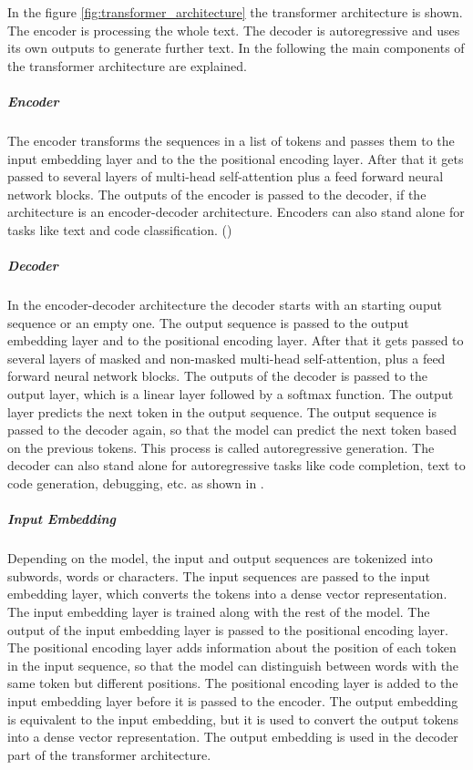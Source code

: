 In the figure \ref{fig:transformer_architecture} the transformer architecture is shown. The encoder is processing the whole text. The decoder is autoregressive and uses its own outputs to generate further text. In the following the main components of the transformer architecture are explained.

\subparagraph{Encoder}

The encoder transforms the sequences in a list of tokens and passes them to the input embedding layer and to the the positional encoding layer. After that it gets passed to several layers of multi-head self-attention plus a feed forward neural network blocks. The outputs of the encoder is passed to the decoder, if the architecture is an encoder-decoder architecture. Encoders can also stand alone for tasks like text and code classification. (\cite{Hou.8212023})

\subparagraph{Decoder}

In the encoder-decoder architecture the decoder starts with an starting ouput sequence or an empty one. The output sequence is passed to the output embedding layer and to the positional encoding layer. After that it gets passed to several layers of masked and non-masked multi-head self-attention, plus a feed forward neural network blocks. The outputs of the decoder is passed to the output layer, which is a linear layer followed by a softmax function. The output layer predicts the next token in the output sequence. The output sequence is passed to the decoder again, so that the model can predict the next token based on the previous tokens. This process is called autoregressive generation.
The decoder can also stand alone for autoregressive tasks like code completion, text to code generation, debugging, etc. as shown in \cite{Hou.8212023}.

\subparagraph{Input Embedding}
Depending on the model, the input and output sequences are tokenized into subwords, words or characters. The input sequences are passed to the input embedding layer, which converts the tokens into a dense vector representation. The input embedding layer is trained along with the rest of the model. The output of the input embedding layer is passed to the positional encoding layer. The positional encoding layer adds information about the position of each token in the input sequence, so that the model can distinguish between words with the same token but different positions. The positional encoding layer is added to the input embedding layer before it is passed to the encoder. The output embedding is equivalent to the input embedding, but it is used to convert the output tokens into a dense vector representation. The output embedding is used in the decoder part of the transformer architecture.

